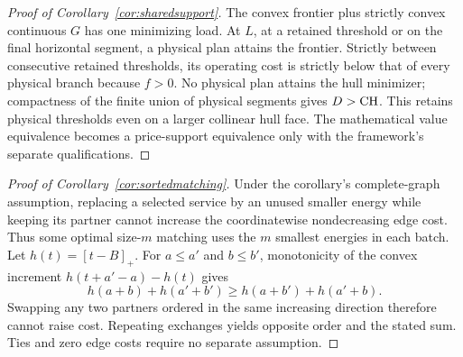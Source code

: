 \begin{proof}[Proof of Corollary~\ref{cor:sharedsupport}]
The convex frontier plus strictly convex continuous $G$ has one minimizing
load. At $L$, at a retained threshold or on the final horizontal segment,
a physical plan attains the frontier. Strictly between consecutive retained
thresholds, its operating cost is strictly below that of every physical
branch because $f>0$. No physical plan attains the hull minimizer; compactness
of the finite union of physical segments gives $D>\mathrm{CH}$. This retains
physical thresholds even on a larger collinear hull face. The mathematical
value equivalence becomes a price-support equivalence only with the
framework's separate qualifications.
\end{proof}

\begin{proof}[Proof of Corollary~\ref{cor:sortedmatching}]
Under the corollary's complete-graph assumption, replacing a selected service
by an unused smaller energy while keeping its
partner cannot increase the coordinatewise nondecreasing edge cost. Thus
some optimal size-$m$ matching uses the $m$ smallest energies in each batch.
Let $h(t)=[t-B]_+$. For $a\le a'$ and $b\le b'$, monotonicity of
the convex increment $h(t+a'-a)-h(t)$ gives
\[
 h(a+b)+h(a'+b')\ge h(a+b')+h(a'+b).
\]
Swapping any two partners ordered in the same increasing direction therefore
cannot raise cost. Repeating exchanges yields opposite order and the stated
sum. Ties and zero edge costs require no separate assumption.
\end{proof}

